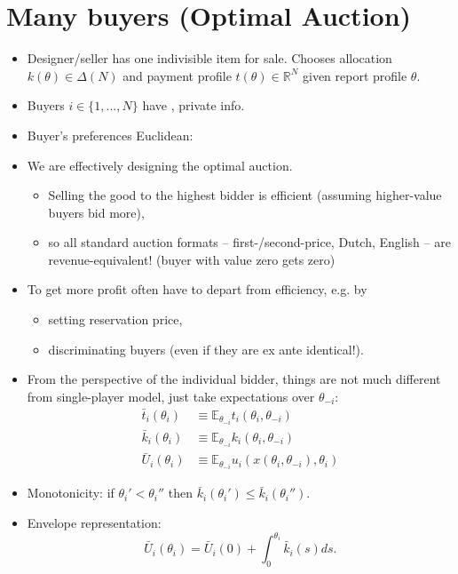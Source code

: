 \documentclass[english,handout,10pt]{beamer}		%
\def\lyxframeend{} %
\begin{document}
\section{Many buyers (Optimal Auction)}

\begin{itemize}
	\item Designer/seller has one indivisible item for sale. Chooses allocation $k(\theta) \in \varDelta(N)$ and payment profile $t(\theta) \in \mathbb{R}^N$ given report profile $\theta$.
	\item Buyers $i \in \{1,...,N\}$ have , private info.
	\item Buyer's preferences Euclidean: 
\end{itemize}
\lyxframeend


\begin{itemize}
	\item We are effectively designing the optimal auction.
	\begin{itemize}
		\item Selling the good to the highest bidder is efficient (assuming higher-value buyers bid more),
		\item so all standard auction formats -- first-/second-price, Dutch, English -- are revenue-equivalent! (buyer with value zero gets zero)
	\end{itemize}
	\item To get more profit often have to depart from efficiency, e.g. by
	\begin{itemize}
		\item setting reservation price,
		\item discriminating buyers (even if they are ex ante identical!).
	\end{itemize}
\end{itemize}
\lyxframeend


\begin{itemize}
	\item From the perspective of the individual bidder, things are not much different from single-player model, just take expectations over $\theta_{-i}$:
	\begin{align*}
		\bar{t}_i(\theta_i) &\equiv \mathbb{E}_{\theta_{-i}} t_i(\theta_i,\theta_{-i})
		\\
		\bar{k}_i(\theta_i) &\equiv \mathbb{E}_{\theta_{-i}} k_i(\theta_i,\theta_{-i})
		\\
		\bar{U}_i(\theta_i) &\equiv \mathbb{E}_{\theta_{-i}} u_i(x(\theta_i,\theta_{-i}),\theta_i)
	\end{align*}
	\item Monotonicity: if $\theta_i' < \theta_i''$ then 
	$\bar{k}_i(\theta_i') \leq \bar{k}_i(\theta_i'').$
	\item Envelope representation: 
	$$\bar{U}_i(\theta_i) = \bar{U}_i(0) + \int_0^{\theta_i} \bar{k}_i(s) ds.$$
\end{itemize}
\lyxframeend
\end{document}
